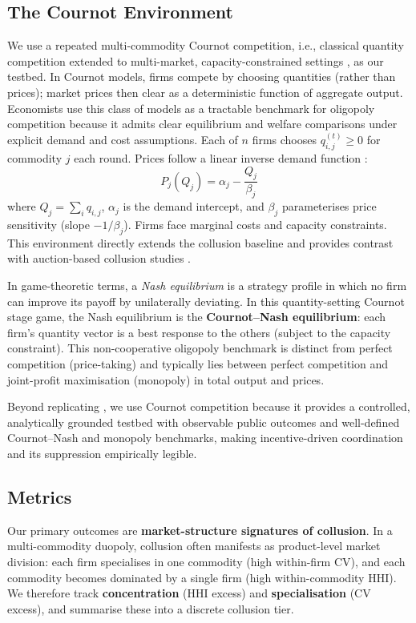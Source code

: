 \documentclass[11pt, a4paper]{article}
\begin{document}
\subsection{The Cournot Environment}
We use a repeated multi-commodity Cournot competition, i.e., classical quantity competition \citep{Cournot1838Recherches} extended to multi-market, capacity-constrained settings \citep{Caldentey2024MultiMarket}, as our testbed. In Cournot models, firms compete by choosing quantities (rather than prices); market prices then clear as a deterministic function of aggregate output. Economists use this class of models as a tractable benchmark for oligopoly competition because it admits clear equilibrium and welfare comparisons under explicit demand and cost assumptions. Each of $n$ firms chooses $q_{i,j}^{(t)} \ge 0$ for commodity $j$ each round. Prices follow a linear inverse demand function \citep{Cournot1838Recherches}:
\begin{equation}
    P_j(Q_j) = \alpha_j - \frac{Q_j}{\beta_j}
\end{equation}
where $Q_j = \sum_i q_{i,j}$, $\alpha_j$ is the demand intercept, and $\beta_j$ parameterises price sensitivity (slope $-1/\beta_j$). Firms face marginal costs and capacity constraints. This environment directly extends the collusion baseline \citep{Lin2024Strategic} and provides contrast with auction-based collusion studies \citep{Agrawal2025DoubleAuctions}.

In game-theoretic terms, a \emph{Nash equilibrium} is a strategy profile in which no firm can improve its payoff by unilaterally deviating. In this quantity-setting Cournot stage game, the Nash equilibrium is the \textbf{Cournot--Nash equilibrium}: each firm's quantity vector is a best response to the others (subject to the capacity constraint). This non-cooperative oligopoly benchmark is distinct from perfect competition (price-taking) and typically lies between perfect competition and joint-profit maximisation (monopoly) in total output and prices.

Beyond replicating \citet{Lin2024Strategic}, we use Cournot competition because it provides a controlled, analytically grounded testbed with observable public outcomes and well-defined Cournot--Nash and monopoly benchmarks, making incentive-driven coordination and its suppression empirically legible.

\subsection{Metrics}
Our primary outcomes are \textbf{market-structure signatures of collusion}. In a multi-commodity duopoly, collusion often manifests as product-level market division: each firm specialises in one commodity (high within-firm CV), and each commodity becomes dominated by a single firm (high within-commodity HHI). We therefore track \textbf{concentration} (HHI excess) and \textbf{specialisation} (CV excess), and summarise these into a discrete collusion tier.
\end{document}
